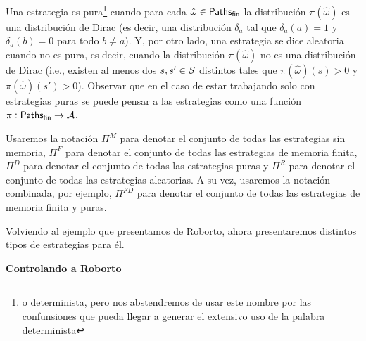 Una estrategia es pura\footnote{o determinista, pero nos abstendremos de usar
	este nombre por las confunsiones que pueda llegar a generar el extensivo uso de
	la palabra determinista} cuando para cada $\hat \omega \in \textsf{Paths}_\textsf{fin}$ la
distribución $\pi(\hat \omega)$ es una distribución de Dirac (es decir, una
distribución $\delta_a$ tal que $\delta_a(a) = 1$ y $\delta_a(b) = 0$ para todo
$b \neq a$). Y, por otro lado, una estrategia se dice aleatoria cuando no es
pura, es decir, cuando la distribución $\pi(\hat \omega)$ no es una
distribución de Dirac (i.e., existen al menos dos $s, s' \in \mathcal{S}$ distintos
tales que $\pi(\hat \omega)(s) > 0$ y $\pi(\hat \omega)(s') > 0$). Observar que
en el caso de estar trabajando solo con estrategias puras se puede pensar a las
estrategias como una función $\pi: \textsf{Paths}_\textsf{fin} \rightarrow \mathcal{A}$.

Usaremos la notación $\Pi^{M}$ para denotar el conjunto de todas las
estrategias sin memoria, $\Pi^{F}$ para denotar el conjunto de todas las
estrategias de memoria finita, $\Pi^{D}$ para denotar el conjunto de todas las
estrategias puras y $\Pi^{R}$ para denotar el conjunto de todas las estrategias
aleatorias. A su vez, usaremos la notación combinada, por ejemplo, $\Pi^{FD}$
para denotar el conjunto de todas las estrategias de memoria finita y puras.

Volviendo al ejemplo que presentamos de Roborto, ahora presentaremos distintos
tipos de estrategias para él.

\textbf{Controlando a Roborto}

